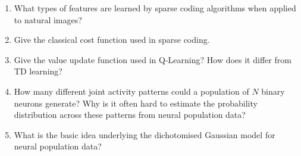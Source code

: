 \documentclass{article}
\newif\ifanswer
\begin{document}
\begin{enumerate}
  \ifanswer \textbf{Answer}: The existence of a teacher (or teaching signal) in supervised learning, and a reward signal in reinforcement learning.\\
  \fi
  
  
\item What types of features are learned by sparse coding algorithms when applied to natural images?

  \ifanswer \textbf{Answer}: Features representing statistics of natural images, such as oriented bars/edges.\\
  \fi
  
\item Give the classical cost function used in sparse coding.

  \ifanswer \textbf{Answer}: $\mathrm{cost} = \Vert U - WV \Vert_2^2 + \lambda \Vert V\Vert_1$, where $V$ is the activity of output neurons and $U$ is the input activity of input neurons. The second term enforces sparsity.\\
  \fi
  
\item Give the value update function used in Q-Learning? How does it differ from TD learning?

  \ifanswer \textbf{Answer}: $\underbrace{Q(S_t, A_t)}_{\mathrm{value}} = Q(S_t, A_t) + (\overbrace{\underbrace{R_{t+1}}_{\mathrm{reward}}+\lambda \underbrace{\mathrm{max}_a Q(S_{t+1},a)}_{\mathrm{future\:value}}}^{\mathrm{learned\:value}}-Q_{t}(S_t,A_t))$. It differs from TD learning in that it takes the action with maximal value for the update, which makes Q-learning an off-policy method.\\
  \fi

\item How many different joint activity patterns could a population of $N$ binary neurons generate? Why is it often hard to estimate the probability distribution across these patterns from neural population data?

\ifanswer \textbf{Answer:} There are $2^N$ possible binary patterns (1 mark). Estimation is hard because $2^N$ is a very large number for any reasonable sized number of neurons, say $N\gtrapprox 20$. In contrast, a typical neural recording may only be about an hour, which would correspond to only $3.6\times10^5$ time bins of $10$ ms each (1 mark for something similar to this reasoning).\\
\fi
  
\item What is the basic idea underlying the dichotomised Gaussian model for neural population data?

  \ifanswer \textbf{Answer:} This model assumes that our observed binary data (spike patterns across the population of neurons) was generated by thresholding an underlying latent (hidden) multivariate gaussian distribution.
  \fi

\end{enumerate}
  
\end{document}
